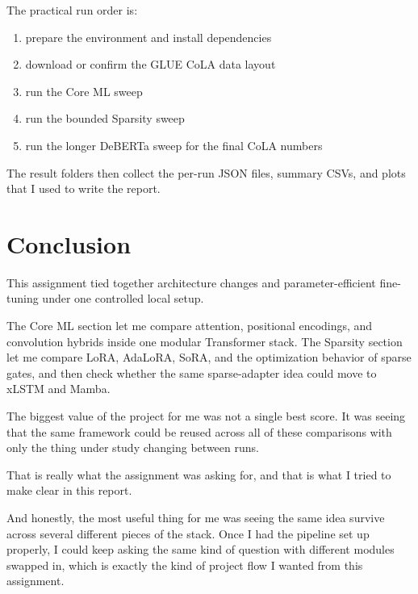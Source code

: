 \documentclass[11pt]{article}
\begin{document}
The practical run order is:
\begin{enumerate}[leftmargin=*]
  \item prepare the environment and install dependencies
  \item download or confirm the GLUE CoLA data layout
  \item run the Core ML sweep
  \item run the bounded Sparsity sweep
  \item run the longer DeBERTa sweep for the final CoLA numbers
\end{enumerate}

The result folders then collect the per-run JSON files, summary CSVs, and plots that I used to write the report.

\section{Conclusion}
This assignment tied together architecture changes and parameter-efficient fine-tuning under one controlled local setup.

The Core ML section let me compare attention, positional encodings, and convolution hybrids inside one modular Transformer stack. The Sparsity section let me compare LoRA, AdaLoRA, SoRA, and the optimization behavior of sparse gates, and then check whether the same sparse-adapter idea could move to xLSTM and Mamba.

The biggest value of the project for me was not a single best score. It was seeing that the same framework could be reused across all of these comparisons with only the thing under study changing between runs.

That is really what the assignment was asking for, and that is what I tried to make clear in this report.

And honestly, the most useful thing for me was seeing the same idea survive across several different pieces of the stack. Once I had the pipeline set up properly, I could keep asking the same kind of question with different modules swapped in, which is exactly the kind of project flow I wanted from this assignment.
\end{document}
